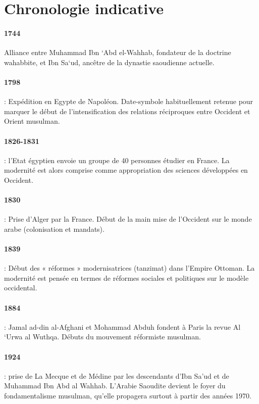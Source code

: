 \section{Chronologie indicative}

 
\paragraph{1744 } Alliance entre Muhammad Ibn ‘Abd el-Wahhab, fondateur de la doctrine wahabbite, et Ibn Sa‘ud, ancêtre de la dynastie saoudienne actuelle.

\paragraph{1798} : Expédition en Egypte de Napoléon. Date-symbole habituellement retenue pour marquer le début de l’intensification des relations réciproques entre Occident et Orient musulman.
\paragraph{1826-1831 }: l’Etat égyptien envoie un groupe de 40 personnes étudier en France. La modernité est alors comprise comme appropriation des sciences développées en Occident.
\paragraph{1830 } : Prise d’Alger par la France. Début de la main mise de l’Occident sur le monde arabe (colonisation et mandats).
\paragraph{1839 } : Début des « réformes » modernisatrices (tanzimat) dans l’Empire Ottoman. La modernité est pensée en termes de réformes sociales et politiques sur le modèle occidental.
\paragraph{1884 } : Jamal ad-din al-Afghani et Mohammad Abduh fondent à Paris la revue Al ‘Urwa al Wuthqa. Débuts du mouvement réformiste musulman.
\paragraph{1924 } : prise de La Mecque et de Médine par les descendants d’Ibn Sa’ud et de Muhammad Ibn Abd al Wahhab. L’Arabie Saoudite devient le foyer du fondamentalisme musulman, qu’elle propagera surtout à partir des années 1970.
